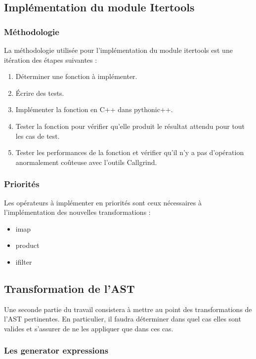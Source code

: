 \documentclass[a4paper]{article}
\begin{document}
\subsection{Implémentation du module Itertools}

\subsubsection{Méthodologie}

La méthodologie utilisée pour l'implémentation du module itertools est
une itération des étapes suivantes :

\begin{enumerate}
\item Déterminer une fonction à implémenter.
\item Écrire des tests.
\item Implémenter la fonction en C++ dans pythonic++.
\item Tester la fonction pour vérifier qu'elle produit le résultat
  attendu pour tout les cas de test.
\item Tester les performances de la fonction et vérifier qu'il n'y a
  pas d'opération anormalement coûteuse avec l'outils Callgrind.
\end{enumerate}

\subsubsection{Priorités}

Les opérateurs à implémenter en priorités sont ceux nécessaires à
l'implémentation des nouvelles transformations :

\begin{itemize}
  \item imap
  \item product
  \item ifilter
\end{itemize}


\subsection{Transformation de l'AST}

Une seconde partie du travail consistera à mettre au point des
transformations de l'AST pertinentes. En particulier, il faudra
déterminer dans quel cas elles sont valides et s'assurer de ne les
appliquer que dans ces cas.

\subsubsection{Les generator expressions}
\end{document}
